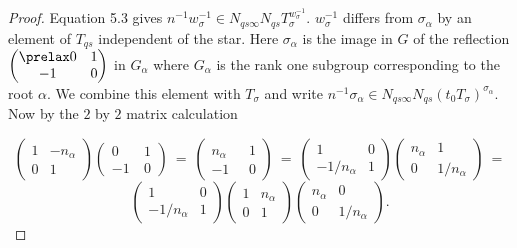 \documentclass{memo-l}
\theoremstyle{definition}
\theoremstyle{remark}
\numberwithin{section}{chapter}
\numberwithin{equation}{chapter}
\begin{document}
\begin{proof}     Equation 5.3 gives $n^{-1}w_{{\sigma}}^{-1} \in
N_{qs{\infty}}N_{qs}T_{{\sigma}}^{w_\sigma^{-1}}$.
$w_{{\sigma}}^{-1}$ differs from ${\sigma}_{{\alpha}}$ by an element of
$T_{qs}$ independent of the star.
 Here ${\sigma}_{{\alpha}}$ is the image in $G$ of the reflection
$
\begin{pmatrix} \prelax
0 & 1 \\ -1 & 0 \end{pmatrix}
$
in $G_{{\alpha}}$ where $G_{{\alpha}}$ is the rank one subgroup corresponding
to the root ${\alpha}$.
 We combine this element with $T_{{\sigma}}$ and write
$n^{-1}{\sigma}_{{\alpha}} \in
N_{qs{\infty}}N_{qs}(t_{0}T_{{\sigma}})^{\sigma_\alpha}.$  Now by the $2$ by $2$ matrix calculation

{\bigskip}

$$
{\begin{pmatrix}
1 & -n_\alpha \\ 0 & 1 \end{pmatrix}}
{\begin{pmatrix}
0\  & 1 \\ -1\  & 0 \end{pmatrix}}\ =\
{\begin{pmatrix}
n_\alpha & 1 \\ -1{\phantom{n}} & 0 \end{pmatrix}}\ =\
{\begin{pmatrix}
1 & 0 \\ -1/n_\alpha & 1 \end{pmatrix}}
{\begin{pmatrix}
n_\alpha & 1 \\ 0 & 1/n_\alpha \end{pmatrix}}\ =
$$
$$
{\begin{pmatrix}
1 & 0 \\ -1/n_\alpha & 1 \end{pmatrix}}
{\begin{pmatrix}
1 & n_\alpha \\ 0 & 1 \end{pmatrix}}
{\begin{pmatrix}
 n_\alpha & 0 \\ 0 & 1/n_\alpha \end{pmatrix}}.
$$


\end{proof}
\end{document}
